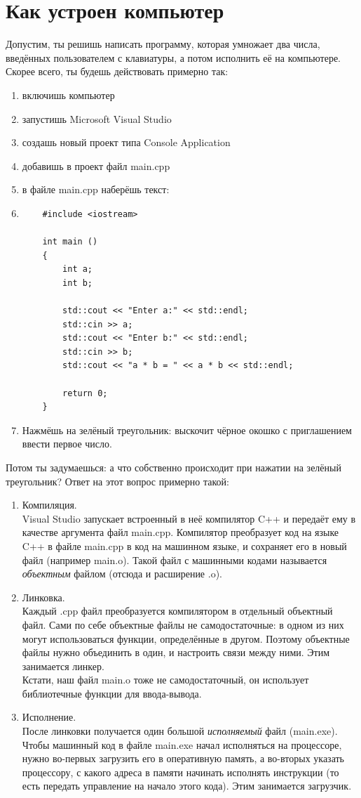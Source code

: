 \documentclass[11pt]{book}
\begin{document}
\tableofcontents

\chapter{Как устроен компьютер}
Допустим, ты решишь написать программу, которая умножает два числа,
введённых пользователем с клавиатуры, а потом исполнить её на компьютере.
Скорее всего, ты будешь действовать примерно так:
\begin{enumerate}
\item включишь компьютер
\item запустишь Microsoft Visual Studio
\item создашь новый проект типа Console Application
\item добавишь в проект файл main.cpp
\item в файле main.cpp наберёшь текст:
\item{
\begin{verbatim}
    #include <iostream>

    int main ()
    {
        int a;
        int b;

        std::cout << "Enter a:" << std::endl;
        std::cin >> a;
        std::cout << "Enter b:" << std::endl;
        std::cin >> b;
        std::cout << "a * b = " << a * b << std::endl;

        return 0;
    }
\end{verbatim}}
\item Нажмёшь на зелёный треугольник: выскочит чёрное окошко
    с приглашением ввести первое число.
\end{enumerate}
Потом ты задумаешься: а что собственно происходит при
нажатии на зелёный треугольник? Ответ на этот вопрос
примерно такой:
\begin{enumerate}
\item Компиляция.
\\
    Visual Studio запускает встроенный в неё компилятор C++ и передаёт
    ему в качестве аргумента файл main.cpp. Компилятор преобразует код
    на языке C++ в файле main.cpp в код на машинном языке, и сохраняет
    его в новый файл (например main.o). Такой файл с машинными кодами
    называется \emph{объектным} файлом (отсюда и расширение .o).
\item Линковка.
\\
    Каждый .cpp файл преобразуется компилятором в отдельный объектный файл.
    Сами по себе объектные файлы не самодостаточные:
    в одном из них могут использоваться функции, определённые в другом.
    Поэтому объектные файлы нужно объединить в один, и настроить связи
    между ними. Этим занимается линкер.
\\
    Кстати, наш файл main.o тоже не самодостаточный, он использует
    библиотечные функции для ввода-вывода.
\item Исполнение.
\\
    После линковки получается один большой \emph{исполняемый} файл (main.exe).
    Чтобы машинный код в файле main.exe начал исполняться на процессоре,
    нужно во-первых загрузить его в оперативную память, а во-вторых
    указать процессору, с какого адреса в памяти начинать исполнять инструкции
    (то есть передать управление на начало этого кода). Этим занимается загрузчик.
\end{enumerate}
\end{document}
